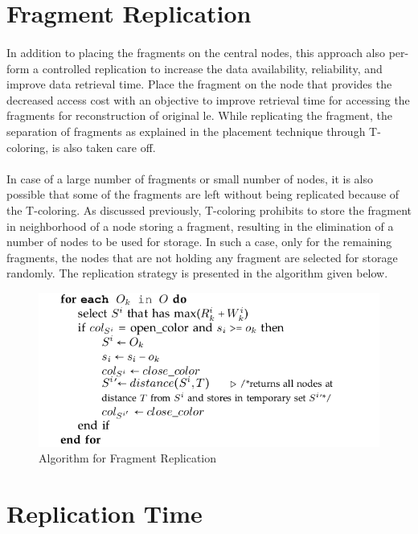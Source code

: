\section{Fragment Replication}
\paragraph*{}
In addition to placing the fragments on the central nodes, this approach also per-
form a controlled replication to increase the data availability, reliability, and improve data
retrieval time. Place the fragment on the node that provides the decreased access cost
with an objective to improve retrieval time for accessing the fragments for reconstruction
of original le. While replicating the fragment, the separation of fragments as explained in
the placement technique through T- coloring, is also taken care off.
\paragraph*{}
In case of a large number of fragments or small number of nodes, it is also possible
that some of the fragments are left without being replicated because of the T-coloring.
As discussed previously, T-coloring prohibits to store the fragment in neighborhood of a
node storing a fragment, resulting in the elimination of a number of nodes to be used for
storage. In such a case, only for the remaining fragments, the nodes that are not holding
any fragment are selected for storage randomly. The replication strategy is presented in
the algorithm given below.
\begin{figure}
	\centering
	\includegraphics[scale=0.5]{replicationalgo}
	\caption{Algorithm for Fragment Replication}
\end{figure}
\section{Replication Time}
